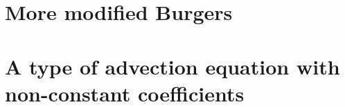 \documentclass[11pt,letter, swedish, english
]{article}
\renewcommand{\thesubsection}{\arabic{section} (\alph{subsection})}
\begin{document}
\section{More modified Burgers}
\renewcommand{\thesubsection}{\arabic{section} (\alph{subsection})}



\section{A type of advection equation with non-constant coefficients}
\end{document}
